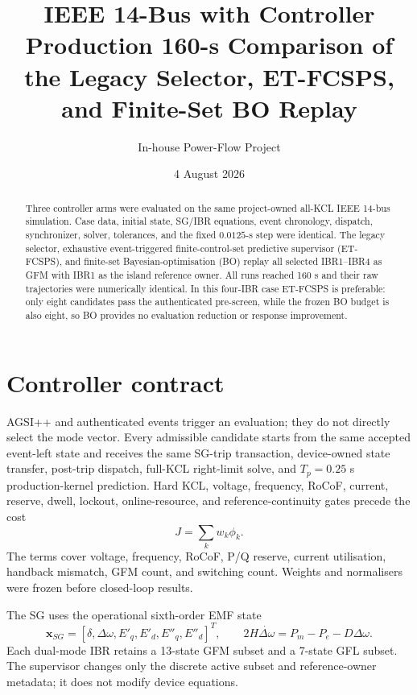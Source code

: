 \documentclass[12pt,a4paper]{article}
\title{\textbf{IEEE 14-Bus with Controller}\\
\large Production 160-s Comparison of the Legacy Selector, ET-FCSPS, and Finite-Set BO Replay}
\author{In-house Power-Flow Project}\date{4 August 2026}
\newcommand{\vect}[1]{\boldsymbol{#1}}
\begin{document}
\maketitle
\begin{abstract}
Three controller arms were evaluated on the same project-owned all-KCL IEEE 14-bus simulation. Case data, initial state, SG/IBR equations, event chronology, dispatch, synchronizer, solver, tolerances, and the fixed $0.0125$-s step were identical. The legacy selector, exhaustive event-triggered finite-control-set predictive supervisor (ET-FCSPS), and finite-set Bayesian-optimisation (BO) replay all selected IBR1--IBR4 as GFM with IBR1 as the island reference owner. All runs reached 160 s and their raw trajectories were numerically identical. In this four-IBR case ET-FCSPS is preferable: only eight candidates pass the authenticated pre-screen, while the frozen BO budget is also eight, so BO provides no evaluation reduction or response improvement.
\end{abstract}

\section{Controller contract}
AGSI++ and authenticated events trigger an evaluation; they do not directly select the mode vector. Every admissible candidate starts from the same accepted event-left state and receives the same SG-trip transaction, device-owned state transfer, post-trip dispatch, full-KCL right-limit solve, and $T_p=0.25$ s production-kernel prediction. Hard KCL, voltage, frequency, RoCoF, current, reserve, dwell, lockout, online-resource, and reference-continuity gates precede the cost
\begin{equation}J=\sum_k w_k\phi_k.
\end{equation}
The terms cover voltage, frequency, RoCoF, P/Q reserve, current utilisation, handback mismatch, GFM count, and switching count. Weights and normalisers were frozen before closed-loop results.

The SG uses the operational sixth-order EMF state
\begin{equation}\vect{x}_{SG}=[\delta,\Delta\omega,E'_q,E'_d,E''_q,E''_d]^T,
\qquad 2H\dot{\Delta\omega}=P_m-P_e-D\Delta\omega.
\end{equation}
Each dual-mode IBR retains a 13-state GFM subset and a 7-state GFL subset. The supervisor changes only the discrete active subset and reference-owner metadata; it does not modify device equations.
\end{document}
